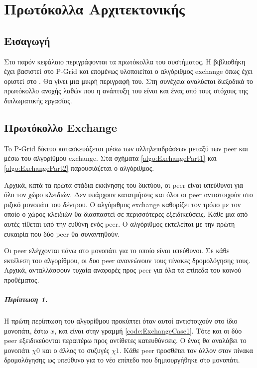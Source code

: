 \chapter{Πρωτόκολλα Αρχιτεκτονικής}
\label{chap:Protocols}

\section{Εισαγωγή}

Στο παρόν κεφάλαιο περιγράφονται τα πρωτόκολλα του συστήματος. Η βιβλιοθήκη 
έχει βασιστεί στο P-Grid και επομένως υλοποιείται ο αλγόριθμος exchange 
όπως έχει οριστεί στο \citep{Abererb}. Θα γίνει μια μικρή περιγραφή του. 
Στη συνέχεια αναλύεται διεξοδικά το πρωτόκολλο ανοχής λαθών που η ανάπτυξη 
του είναι και ένας από τους στόχους της διπλωματικής εργασίας.

\section{Πρωτόκολλο Exchange}

To P-Grid δίκτυο κατασκευάζεται μέσω των αλληλεπιδράσεων μεταξύ των peer 
και μέσω του αλγορίθμου exchange. Στα σχήματα \ref{algo:ExchangePart1} και 
\ref{algo:ExchangePart2} παρουσιάζεται ο αλγόριθμος.

Αρχικά, κατά τα πρώτα στάδια εκκίνησης του δικτύου, οι peer είναι υπεύθυνοι 
για όλο τον χώρο κλειδιών. Δεν υπάρχουν κατατμήσεις και όλοι οι peer 
αντιστοιχούν στο ριζικό μονοπάτι του δέντρου. Ο αλγόριθμος exchange 
καθορίζει τον τρόπο με τον οποίο ο χώρος κλειδιών θα διασπαστεί σε 
περισσότερες εξειδικεύσεις. Κάθε μια από αυτές τίθεται υπό την ευθύνη 
ενός peer. Ο αλγόριθμος εκτελείται με την πρώτη ευκαιρία που δύο peer 
θα συναντηθούν.

Οι peer ελέγχονται πάνω στο μονοπάτι για το οποίο είναι υπεύθυνοι. 
Σε κάθε εκτέλεση του αλγορίθμου, οι δυο peer ανανεώνουν τους πίνακες 
δρομολόγησης τους. Αρχικά, ανταλλάσσουν τυχαία αναφορές προς peer για όλα 
τα επίπεδα του κοινού προθέματος.

\paragraph{Περίπτωση 1.} Η πρώτη περίπτωση του αλγορίθμου προκύπτει όταν 
αυτοί αντιστοιχούν στο ίδιο μονοπάτι, έστω $x$, και είναι στην γραμμή 
\ref{code:ExchangeCase1}. Τότε και οι δύο peer 
εξειδικεύονται περαιτέρω προς αντίθετες κατευθύνσεις. Ο ένας θα αναλάβει 
το μονοπάτι $χ0$ και ο άλλος το συζυγές $χ1$. Κάθε peer προσθέτει τον άλλον 
στον πίνακα δρομολόγησης ως υπεύθυνο για το νέο επίπεδο που δημιουργήθηκε 
στο μονοπάτι.

